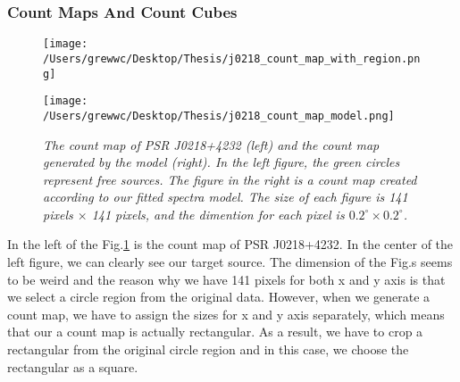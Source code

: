 \documentclass[12pt]{report}
\newcommand{\mycaption}[1]{\caption{\textit{\footnotesize #1}}}
\begin{document}
          \subsubsection{Count Maps And Count Cubes}
          \begin{figure}[!ht]  
            \begin{center}
            \begin{minipage}{0.45\textwidth}
              \begin{center} 
                  \texttt{[image: /Users/grewwc/Desktop/Thesis/j0218\_count\_map\_with\_region.png]}
              \end{center}
            \end{minipage}
            \begin{minipage}{0.45\textwidth}
              \begin{center} 
                  \texttt{[image: /Users/grewwc/Desktop/Thesis/j0218\_count\_map\_model.png]}
              \end{center}
            \end{minipage}
          \end{center}
            \begin{center}
              \mycaption{The count map of PSR J0218+4232 (left) and the count map generated by the model (right). 
              In the left figure,
              the green circles represent free sources. The figure in the right is a count map created 
              according to our fitted spectra model. 
              The size of each figure is 141 pixels $\times$ 141 pixels, and the dimention for 
              each pixel is $0.2^\circ \times 0.2^\circ$.}
            \label{fig: j0218_count_map_and_model}    
            \end{center} 
          \end{figure}
          In the left of the Fig.\ref{fig: j0218_count_map_and_model} 
          is the count map of PSR J0218+4232.
          In the center of the left figure, 
          we can clearly see our target source. The dimension of the Fig.s seems to be weird and 
          the reason why we have 141 pixels for both x and y axis is that we select a circle region from 
          the original data. However, when we generate a count map, we have to assign the sizes for x and y 
          axis separately, which means that our a count map is actually rectangular. As a result, we have to crop a 
          rectangular from the original circle region and in this case, we choose the rectangular as a square.  
          
\end{document}

